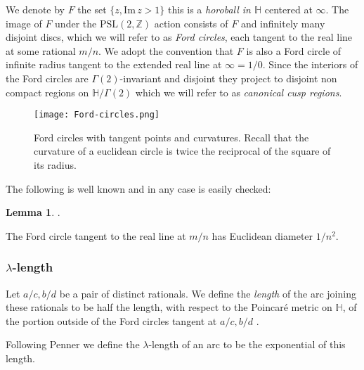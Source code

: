 \documentclass[12pt]{amsart}
\theoremstyle{plain}
\theoremstyle{definition}
\newtheorem{lem}[thm]{Lemma}
\def\HH{\mathbb{H}}
\def\im{\mathrm{Im}\,}
\def\xx{\HH/g2}
\def\ZZ{\mathbb{Z}}
\def\sl2{\mathrm{PSL}(2, \ZZ)}
\def\g2{\Gamma(2)}
\def\xx{\HH/\g2}
\begin{document}
We denote by $F$ the set  $\{ z, \im z > 1\}$
this is a \textit{horoball in $\HH$} centered at $\infty$.
The image of $F$ under the $\sl2$ action consists of
$F$ and infinitely many disjoint discs, 
which we will refer to as \textit{Ford circles}, 
each tangent to the real line at some rational $m/n$.
We adopt the convention that $F$ is also a Ford circle of infinite radius
tangent to the extended real line at $\infty = 1/0$.
Since the interiors of the Ford circles are $\Gamma(2)$-invariant
and disjoint they project to disjoint non compact regions on $\xx$
which we will refer to as \textit{canonical cusp regions}.


\begin{figure}[ht]
\begin{center}
\texttt{[image: Ford-circles.png]} 
\end{center}
\caption{Ford circles with tangent points and curvatures.
Recall that the 
curvature of a euclidean circle is twice the reciprocal of the square of its radius.}%
\end{figure}

The following is well known \cite{ford,conway} and in any case is easily checked:

\begin{lem}\label{ford}.

The Ford circle tangent to the real line at $m/n$
has Euclidean diameter $1/n^2$.
\end{lem}





\subsubsection{$\lambda$-length}

Let $a/c, b/d$ be a pair of distinct rationals.
We define the \textit{length} of the arc 
joining these rationals 
to be half the length, with respect to the Poincaré metric on $\HH$, 
of the portion  outside of the Ford circles tangent at $a/c, b/d$ .


Following Penner \cite{bob} we define the
$\lambda$-length of an arc to be the exponential of this 
length.
\end{document}
